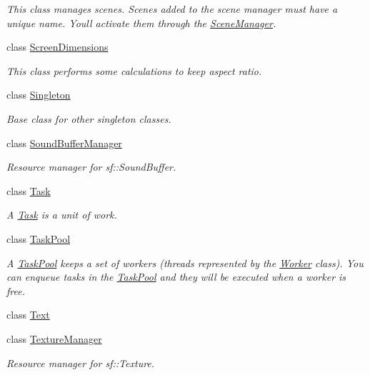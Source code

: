 \begin{DoxyCompactItemize}
\begin{DoxyCompactList}\small\item\em This class manages scenes. Scenes added to the scene manager must have a unique name. You\textquotesingle{}ll activate them through the \hyperlink{classzt_1_1_scene_manager}{Scene\+Manager}. \end{DoxyCompactList}\item 
class \hyperlink{classzt_1_1_screen_dimensions}{Screen\+Dimensions}
\begin{DoxyCompactList}\small\item\em This class performs some calculations to keep aspect ratio. \end{DoxyCompactList}\item 
class \hyperlink{classzt_1_1_singleton}{Singleton}
\begin{DoxyCompactList}\small\item\em Base class for other singleton classes. \end{DoxyCompactList}\item 
class \hyperlink{classzt_1_1_sound_buffer_manager}{Sound\+Buffer\+Manager}
\begin{DoxyCompactList}\small\item\em Resource manager for sf\+::\+Sound\+Buffer. \end{DoxyCompactList}\item 
class \hyperlink{classzt_1_1_task}{Task}
\begin{DoxyCompactList}\small\item\em A \hyperlink{classzt_1_1_task}{Task} is a unit of work. \end{DoxyCompactList}\item 
class \hyperlink{classzt_1_1_task_pool}{Task\+Pool}
\begin{DoxyCompactList}\small\item\em A \hyperlink{classzt_1_1_task_pool}{Task\+Pool} keeps a set of workers (threads represented by the \hyperlink{classzt_1_1_worker}{Worker} class). You can enqueue tasks in the \hyperlink{classzt_1_1_task_pool}{Task\+Pool} and they will be executed when a worker is free. \end{DoxyCompactList}\item 
class \hyperlink{classzt_1_1_text}{Text}
\item 
class \hyperlink{classzt_1_1_texture_manager}{Texture\+Manager}
\begin{DoxyCompactList}\small\item\em Resource manager for sf\+::\+Texture. \end{DoxyCompactList}\item 

\end{DoxyCompactItemize}
